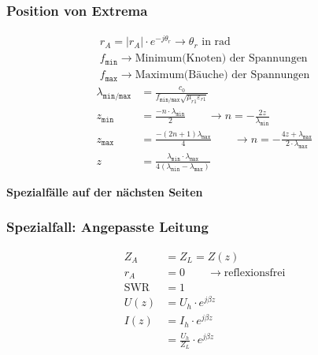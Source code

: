 \subsubsection{Position von Extrema}
\begin{gather*}
    \boxed{r_A = |r_A|\cdot e^{-j\theta_r}}\rightarrow\theta_r\text{ in rad}\\
    f_\texttt{min}\rightarrow \text{Minimum(Knoten) der Spannungen}\\
    f_\texttt{max}\rightarrow \text{Maximum(Bäuche) der Spannungen}
\end{gather*}
\begin{align*}
    \lambda_\texttt{min/max} & = \frac{c_0}{f_\texttt{min/max}\sqrt{\mu_{r1}\varepsilon_{r1}}}                                                                                                 \\
    z_\texttt{min}           & =\frac{-n\cdot\lambda_\texttt{min}}{2}                                        \qquad\rightarrow n = -\frac{2z}{\lambda_\texttt{min}}                            \\
    z_\texttt{max}           & =\frac{-(2n+1)\lambda_\texttt{max}}{4}                                        \qquad\rightarrow n = -\frac{4z+\lambda_\texttt{max}}{2\cdot\lambda_\texttt{max}} \\
    z                        & = \frac{\lambda_\texttt{min}\cdot\lambda_\texttt{max}}{4(\lambda_\texttt{min}-\lambda_\texttt{max})}
\end{align*}

\vspace{20pt}
\textbf{Spezialfälle auf der nächsten Seiten}
\pagebreak

\subsubsection{Spezialfall: Angepasste Leitung}
\begin{align*}
    Z_A          & = Z_L = Z(z)                              \\
    r_A          & = 0\qquad\rightarrow\text{reflexionsfrei} \\
    \mathrm{SWR} & = 1                                       \\
    U(z)         & = U_h\cdot e ^{j\beta z}                  \\
    I(z)         & = I_h \cdot e^{j\beta z}                  \\
                 & = \frac{U_h}{Z_L}\cdot e^{j\beta z}
\end{align*}

